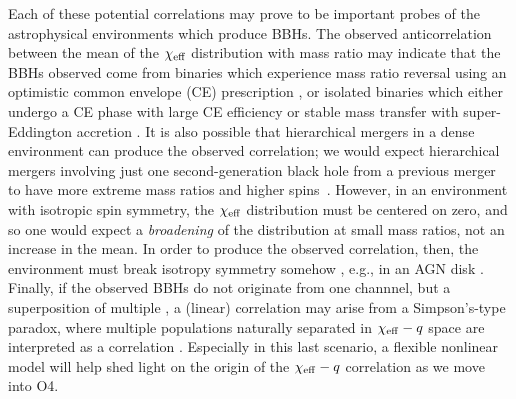 \begin{refsection}

Each of these potential correlations may prove to be important probes of the astrophysical environments which produce BBHs. The observed anticorrelation between the mean of the $\chi_{\rm eff}$ distribution with mass ratio may indicate that the BBHs observed come from binaries which experience mass ratio reversal using an optimistic common envelope (CE) prescription \cite{Broekgaarden:2022nst}, or isolated binaries which either undergo a CE phase with large CE efficiency or stable mass transfer with super-Eddington accretion \cite{Bavera:2020uch, Zevin:2022wrw}. It is also possible that hierarchical mergers in a dense environment can produce the observed correlation; we would expect hierarchical mergers involving just one second-generation black hole from a previous merger to have more extreme mass ratios and higher spins~\cite[e.g.,][]{Gerosa:2021mno}. However, in an environment with isotropic spin symmetry, the $\chi_{\rm eff}$ distribution must be centered on zero, and so one would expect a \textit{broadening} of the distribution at small mass ratios, not an increase in the mean. In order to produce the observed correlation, then, the environment must break isotropy symmetry somehow \cite{Santini:2023ukl}, e.g., in an AGN disk \cite{McKernan:2021nwk, Santini:2023ukl}. Finally, if the observed BBHs do not originate from one channnel, but a superposition of multiple \cite[e.g.,][]{Zevin:2020gbd,Cheng:2023ddt}, a (linear) correlation may arise from a Simpson's-type paradox, where multiple populations naturally separated in $\chi_{\rm eff}-q$ space are %
interpreted as a correlation \cite{Baibhav:2022qxm}. Especially in this last scenario, a flexible nonlinear model will help shed light on the origin of the $\chi_{\rm eff}-q$ correlation as we move into O4. 


\end{refsection}
